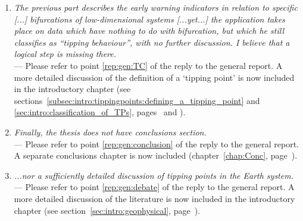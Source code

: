 \begin{enumerate}
\item \emph{The previous part describes the early warning indicators in relation to specific [...] bifurcations of low-dimensional systems [...yet...] the application takes place on data which have nothing to do with bifurcation, but which he still classifies as “tipping behaviour”, with no further discussion. I believe that a logical step is missing there.}\\
— Please refer to point \ref{rep:gen:TC} of the reply to the general report. A more detailed discussion of the definition of a `tipping point' is now included in the introductory chapter (see sections~\ref{subsec:intro:tippingpoints:defining_a_tipping_point} and \ref{sec:intro:classification_of_TPs}, pages~\pageref{subsec:intro:tippingpoints:defining_a_tipping_point} and \pageref{sec:intro:classification_of_TPs}).
\item \emph{Finally, the thesis does not have conclusions section.}\\
— Please refer to point \ref{rep:gen:conclusion} of the reply to the general report. A separate conclusions chapter is now included (chapter~\ref{chap:Conc}, page~\pageref{chap:Conc}).
\item \emph{...nor a sufficiently detailed discussion of tipping points in the Earth system.} \\
— Please refer to point \ref{rep:gen:debate} of the reply to the general report. A more detailed discussion of the literature is now included in the introductory chapter (see section~\ref{sec:intro:geophysical}, page~\pageref{sec:intro:geophysical}).
\end{enumerate}

\pagebreak